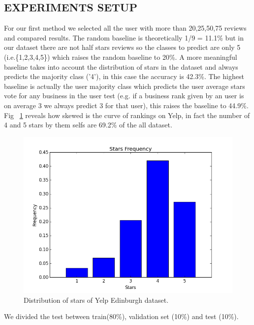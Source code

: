 \documentclass[11pt]{article}
\begin{document}
\subsection{EXPERIMENTS SETUP}
For our first method we selected all the user with more than 20,25,50,75 reviews and compared results. The random baseline is theoretically 1/9 = 11.1\% but in our dataset there are not half stars reviews so the classes to predict are only 5 (i.e.\{1,2,3,4,5\}) which raises the random baseline to 20\%.
A more meaningful baseline takes into account the distribution of stars in the dataset and always predicts the majority class ('4'), in this case the accuracy is 42.3\%.
  The highest baseline is actually the user majority class which predicts the user average stars vote for any business in the user test (e.g. if a business rank given by an user is on average 3 we always predict 3 for that user), this raises the baseline to 44.9\%.\\
Fig ~\ref{histStars} reveals how skewed is the curve of rankings on Yelp, in fact the number of 4 and 5 stars by them selfs are 69.2\% of the all dataset.
\begin{figure}[thpb]
	\centering
	\includegraphics[scale=0.4]{img/starsFrequency.png}
	\caption{Distribution of stars of Yelp Edinburgh dataset.}
	\label{histStars}
\end{figure}
We divided the test between train(80\%), validation set (10\%) and test (10\%).
\end{document}
